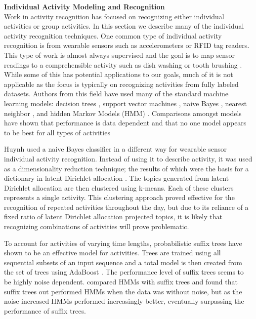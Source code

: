 \bigskip
\noindent \textbf{Individual Activity Modeling and Recognition} \\
Work in activity recognition has focused on recognizing either individual activities or group activities.  In this section we describe many of the individual activity recognition techniques.  One common type of individual activity recognition is from wearable sensors such as accelerometers or RFID tag readers.  This type of work is almost always supervised and the goal is to map sensor readings to a comprehensible activity such as dish washing or tooth brushing \cite{Wang2009,Bao2004}.  While some of this has potential applications to our goals, much of it is not applicable as the focus is typically on recognizing activities from fully labeled datasets.  Authors from this field have used many of the standard machine learning models: decision trees \cite{Bao2004}, support vector machines \cite{Krishnan2008,Bao2004,Lustrek2009}, naive Bayes \cite{Bao2004,Lustrek2009}, nearest neighbor \cite{Bao2004,Lustrek2009}, and hidden Markov Models (HMM) \cite{Wang2009,Oliver2002}.  Comparisons amongst models have shown that performance is data dependent and that no one model appears to be best for all types of activities \cite{Bao2004,Lustrek2009}

Huynh \cite{Huynh2008} used a naive Bayes classifier in a different way for wearable sensor individual activity recognition.  Instead of using it to describe activity, it was used as a dimensionality reduction technique; the results of which were the basis for a dictionary in latent Dirichlet allocation \cite{Blei2003}.  The topics generated from latent Dirichlet allocation are then clustered using k-means.  Each of these clusters represents a single activity.  This clustering approach proved effective for the recognition of repeated activities throughout the day, but due to its reliance of a fixed ratio of latent Dirichlet allocation projected topics, it is likely that recognizing combinations of activities will prove problematic.

To account for activities of varying time lengths, probabilistic suffix trees \cite{Hamid2007} have shown to be an effective model for activities.  Trees are trained using all sequential subsets of an input sequence and a total model is then created from the set of trees using AdaBoost \cite{Freund1996}.  The performance level of suffix trees seems to be highly noise dependent.  \cite{Hamid2006} compared HMMs with suffix trees and found that suffix trees out performed HMMs when the data was without noise, but as the noise increased HMMs performed increasingly better, eventually surpassing the performance of suffix trees.

